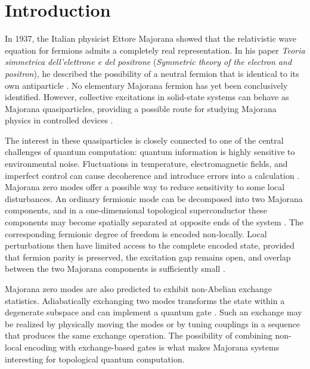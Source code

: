 \chapter{Introduction}




In 1937, the Italian physicist Ettore Majorana showed that the relativistic wave equation for fermions admits a completely real representation. In his paper \textit{Teoria simmetrica dell'elettrone e del positrone} (\textit{Symmetric theory of the electron and positron}), he described the possibility of a neutral fermion that is identical to its own antiparticle \cite{majoranaTeoriaSimmetricaDellelettrone1937,narozhnyMajoranaFermionsNonuniform2017}. No elementary Majorana fermion has yet been conclusively identified. However, collective excitations in solid-state systems can behave as Majorana quasiparticles, providing a possible route for studying Majorana physics in controlled devices \cite{mourikSignaturesMajoranaFermions2012, brouwerEnterMajoranaFermion2012,MajoranaFeiMiZiYuTuoBuLiangZiJiSuan2017}.

The interest in these quasiparticles is closely connected to one of the central challenges of quantum computation: quantum information is highly sensitive to environmental noise. Fluctuations in temperature, electromagnetic fields, and imperfect control can cause decoherence and introduce errors into a calculation \cite{ayukaryanaQuestHopeMajorana2021}. Majorana zero modes offer a possible way to reduce sensitivity to some local disturbances. An ordinary fermionic mode can be decomposed into two Majorana components, and in a one-dimensional topological superconductor these components may become spatially separated at opposite ends of the system \cite{aguadoNewTrendsPlatforms2024,ayukaryanaQuestHopeMajorana2021, harleObservingBraidingTopological2023}. The corresponding fermionic degree of freedom is encoded non-locally. Local perturbations then have limited access to the complete encoded state, provided that fermion parity is preserved, the excitation gap remains open, and overlap between the two Majorana components is sufficiently small \cite{ayukaryanaQuestHopeMajorana2021,castagnoliNotionsSymmetryComputational1993}.

Majorana zero modes are also predicted to exhibit non-Abelian exchange statistics. Adiabatically exchanging two modes transforms the state within a degenerate subspace and can implement a quantum gate \cite{lianTopologicalQuantumComputation2018,MajoranaFeiMiZiYuTuoBuLiangZiJiSuan2017}. Such an exchange may be realized by physically moving the modes or by tuning couplings in a sequence that produces the same exchange operation. The possibility of combining non-local encoding with exchange-based gates is what makes Majorana systems interesting for topological quantum computation.

